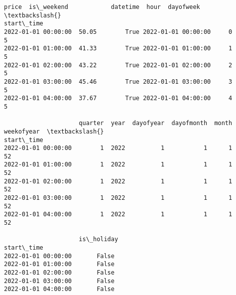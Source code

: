 \documentclass[11pt]{article}
\makeatletter
\newcommand{\boxspacing}{\kern\kvtcb@left@rule\kern\kvtcb@boxsep}
\newcommand{\prompt}[4]{
        {\ttfamily\llap{{\color{#2}[#3]:\hspace{3pt}#4}}\vspace{-\baselineskip}}
    }
\makeatother
\begin{document}
            \begin{tcolorbox}[breakable, size=fbox, boxrule=.5pt, pad at break*=1mm, opacityfill=0]
\prompt{Out}{outcolor}{19}{\boxspacing}
\begin{Verbatim}[commandchars=\\\{\}]
                     price  is\_weekend            datetime  hour  dayofweek  \textbackslash{}
start\_time
2022-01-01 00:00:00  50.05        True 2022-01-01 00:00:00     0          5
2022-01-01 01:00:00  41.33        True 2022-01-01 01:00:00     1          5
2022-01-01 02:00:00  43.22        True 2022-01-01 02:00:00     2          5
2022-01-01 03:00:00  45.46        True 2022-01-01 03:00:00     3          5
2022-01-01 04:00:00  37.67        True 2022-01-01 04:00:00     4          5

                     quarter  year  dayofyear  dayofmonth  month  weekofyear  \textbackslash{}
start\_time
2022-01-01 00:00:00        1  2022          1           1      1          52
2022-01-01 01:00:00        1  2022          1           1      1          52
2022-01-01 02:00:00        1  2022          1           1      1          52
2022-01-01 03:00:00        1  2022          1           1      1          52
2022-01-01 04:00:00        1  2022          1           1      1          52

                     is\_holiday
start\_time
2022-01-01 00:00:00       False
2022-01-01 01:00:00       False
2022-01-01 02:00:00       False
2022-01-01 03:00:00       False
2022-01-01 04:00:00       False
\end{Verbatim}
\end{tcolorbox}
        
\end{document}
